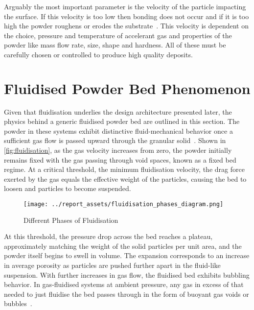 Arguably the most important parameter is the velocity of the particle impacting the surface. If this velocity is too low then bonding does not occur and if it is too high the powder roughens or erodes the substrate~\cite{Guo2022}. This velocity is dependent on the choice, pressure and temperature of accelerant gas and properties of the powder like mass flow rate, size, shape and hardness. All of these must be carefully chosen or controlled to produce high quality deposits.

\newpage

\section{Fluidised Powder Bed Phenomenon}
Given that fluidisation underlies the design architecture presented later, the physics behind a generic fluidised powder bed are outlined in this section. The powder in these systems exhibit distinctive fluid-mechanical behavior once a sufficient gas flow is passed upward through the granular solid~\cite{KuniiLevenspiel1977}. Shown in \autoref{fig:fluidisation}, as the gas velocity increases from zero, the powder initially remains fixed with the gas passing through void spaces, known as a fixed bed regime. At a critical threshold, the minimum fluidisation velocity, the drag force exerted by the gas equals the effective weight of the particles, causing the bed to loosen and particles to become suspended.
\begin{figure}[htbp]
    \centering
    
    \begin{minipage}{0.63\textwidth}
        \centering
        \texttt{[image: ../report\_assets/fluidisation\_phases\_diagram.png]}
        \caption{Different Phases of Fluidisation~\cite{klaren2021fluidization}}
    \end{minipage}
    
\end{figure}\label{fig:fluidisation}
At this threshold, the pressure drop across the bed reaches a plateau, approximately matching the weight of the solid particles per unit area, and the powder itself begins to swell in volume. The expansion corresponds to an increase in average porosity as particles are pushed further apart in the fluid-like suspension. With further increases in gas flow, the fluidised bed exhibits bubbling behavior. In gas-fluidised systems at ambient pressure, any gas in excess of that needed to just fluidise the bed passes through in the form of buoyant gas voids or bubbles~\cite{SHENG2022137168}.

